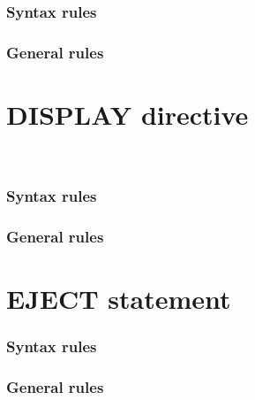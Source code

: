 \subsubsection{Syntax rules}

\subsubsection{General rules}

\section{DISPLAY directive}

\begin{syntax}[\miscextcolour]
  \begin{1=}
    \gnucobol{\directiveindicator} \\
    \textdollar
  \end{1=}
   \sourcetext
\end{syntax}

\begin{syntax}[\miscextcolour]
\end{syntax}

\subsubsection{Syntax rules}

\subsubsection{General rules}

\section{EJECT statement}

\begin{syntax}[\miscextcolour]
\end{syntax}

\subsubsection{Syntax rules}

\subsubsection{General rules}

